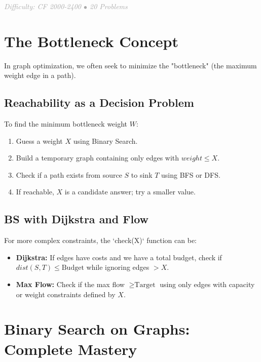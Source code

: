 \documentclass[11pt,a4paper,oneside]{book}
\begin{document}
\vspace{0.5cm}

\begin{center}
\textit{\textcolor{darkgray}{Difficulty: CF 2000-2400 $\bullet$ 20 Problems}}
\end{center}

\section{The Bottleneck Concept}

In graph optimization, we often seek to minimize the "bottleneck" (the maximum weight edge in a path). 

\subsection{Reachability as a Decision Problem}
To find the minimum bottleneck weight $W$:
\begin{enumerate}
    \item Guess a weight $X$ using Binary Search.
    \item Build a temporary graph containing only edges with $weight \leq X$.
    \item Check if a path exists from source $S$ to sink $T$ using BFS or DFS.
    \item If reachable, $X$ is a candidate answer; try a smaller value.
\end{enumerate}



\subsection{BS with Dijkstra and Flow}
For more complex constraints, the `check(X)` function can be:
\begin{itemize}
    \item \textbf{Dijkstra:} If edges have costs and we have a total budget, check if $dist(S, T) \leq \text{Budget}$ while ignoring edges $> X$.
    \item \textbf{Max Flow:} Check if the max flow $\geq \text{Target}$ using only edges with capacity or weight constraints defined by $X$.
\end{itemize}

\section{Binary Search on Graphs: Complete Mastery}
\end{document}
